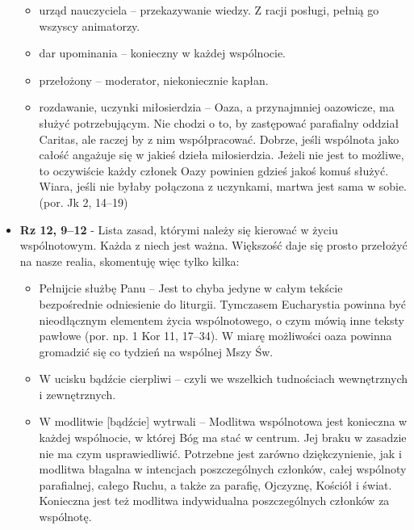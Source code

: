 \documentclass[a5paper,10pt,polish]{book}
\begin{document}
\begin{itemize}
\begin{itemize}
\item {} 
urząd nauczyciela – przekazywanie wiedzy. Z racji posługi, pełnią go wszyscy animatorzy.

\item {} 
dar upominania – konieczny w każdej wspólnocie.

\item {} 
przełożony – moderator, niekoniecznie kapłan.

\item {} 
rozdawanie, uczynki miłosierdzia – Oaza, a przynajmniej  oazowicze, ma służyć potrzebującym. Nie chodzi o to, by zastępować parafialny oddział Caritas, ale raczej by z nim współpracować. Dobrze, jeśli wspólnota jako całość angażuje się w jakieś dzieła miłosierdzia. Jeżeli nie jest to możliwe, to oczywiście każdy członek Oazy powinien gdzieś jakoś komuś służyć. Wiara, jeśli nie byłaby połączona  z uczynkami,  martwa jest sama w sobie. (por. Jk 2, 14–19)

\end{itemize}

\item {} 
\textbf{Rz 12, 9–12} - Lista zasad, którymi należy się kierować w życiu wspólnotowym. Każda z niech jest ważna. Większość daje się prosto przełożyć na nasze realia, skomentuję więc tylko kilka:
\begin{itemize}
\item {} 
Pełnijcie służbę Panu – Jest to chyba jedyne w całym tekście bezpośrednie odniesienie do liturgii. Tymczasem Eucharystia powinna być nieodłącznym elementem życia wspólnotowego, o czym mówią inne teksty pawłowe (por. np. 1 Kor 11, 17–34). W miarę możliwości oaza powinna gromadzić się co tydzień na wspólnej Mszy Św.

\item {} 
W ucisku bądźcie cierpliwi – czyli we wszelkich tudnościach wewnętrznych i zewnętrznych.

\item {} 
W modlitwie {[}bądźcie{]} wytrwali – Modlitwa wspólnotowa jest konieczna w każdej wspólnocie, w której Bóg ma stać w centrum. Jej braku w zasadzie nie ma czym usprawiedliwić. Potrzebne jest zarówno dziękczynienie, jak i modlitwa błagalna w intencjach  poszczególnych członków, całej wspólnoty parafialnej, całego Ruchu, a także za parafię, Ojczyznę, Kościół i świat. Konieczna jest też modlitwa indywidualna poszczególnych członków za wspólnotę.

\end{itemize}


\end{itemize}
\end{document}
